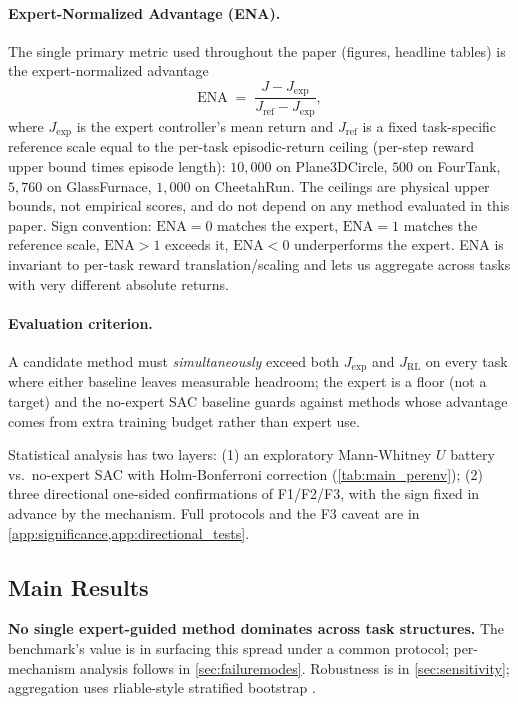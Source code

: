 \documentclass{article}
\newcommand{\nbias}{\mathrm{ENA}}
\begin{document}
\paragraph{Expert-Normalized Advantage (ENA).} The single primary
metric used throughout the paper (figures, headline tables) is the
expert-normalized advantage
\begin{equation}
\nbias \;=\; \frac{J - J_{\mathrm{exp}}}{J_{\mathrm{ref}} - J_{\mathrm{exp}}},
\label{eq:nbias}
\end{equation}
where $J_{\mathrm{exp}}$ is the expert controller's mean return and
$J_{\mathrm{ref}}$ is a fixed task-specific reference scale equal to
the per-task episodic-return ceiling (per-step reward upper bound
times episode length): $10{,}000$ on Plane3DCircle, $500$ on FourTank,
$5{,}760$ on GlassFurnace,
$1{,}000$ on CheetahRun. The ceilings are physical upper bounds, not
empirical scores, and do not depend on any method evaluated in this
paper. Sign convention: $\mathrm{ENA}=0$ matches the expert,
$\mathrm{ENA}=1$ matches the reference scale, $\mathrm{ENA}>1$ exceeds
it, $\mathrm{ENA}<0$ underperforms the expert. ENA is invariant to
per-task reward translation/scaling and lets us aggregate across tasks
with very different absolute returns.

\paragraph{Evaluation criterion.} A candidate method must
\emph{simultaneously} exceed both $J_{\mathrm{exp}}$ and $J_{\mathrm{RL}}$
on every task where either baseline leaves measurable headroom; the
expert is a floor (not a target) and the no-expert SAC baseline
guards against methods whose advantage comes from extra training
budget rather than expert use.

Statistical analysis has two layers: (1) an exploratory
Mann-Whitney $U$ battery vs.\ no-expert SAC with Holm-Bonferroni
correction (\cref{tab:main_perenv}); (2) three directional one-sided
confirmations of F1/F2/F3, with the sign fixed in advance by the
mechanism. Full protocols and the F3 caveat are in
\cref{app:significance,app:directional_tests}.

\subsection{Main Results}
\label{sec:main-results}

\textbf{No single expert-guided method dominates across task structures.}
The benchmark's value is in surfacing this spread under a common
protocol; per-mechanism analysis follows in \cref{sec:failuremodes}.
Robustness is in \cref{sec:sensitivity}; aggregation uses
rliable-style stratified bootstrap \citep{agarwal2021rliable}.
\end{document}
